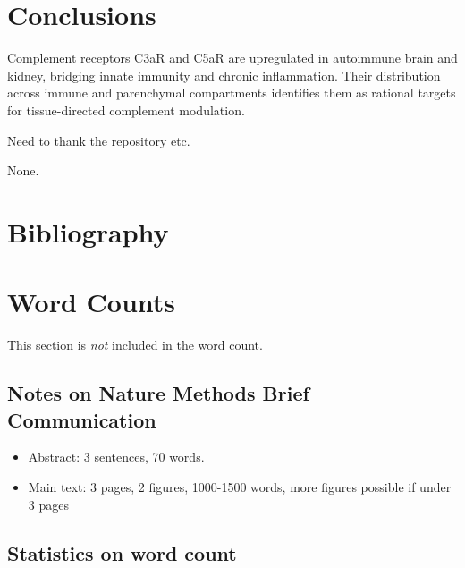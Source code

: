 \documentclass[times, twoside, watermark]{zHenriquesLab-StyleBioRxiv}
\begin{document}
\section*{Conclusions}
	Complement receptors C3aR and C5aR are upregulated in autoimmune brain and kidney, bridging innate immunity and chronic inflammation. Their distribution across immune and parenchymal compartments identifies them as rational targets for tissue-directed complement modulation.

\begin{acknowledgements}
Need to thank the repository etc.
\end{acknowledgements}

\begin{interests}
None.
\end{interests}

\section*{Bibliography}
%


\onecolumn
\newpage

\section*{Word Counts}
This section is \textit{not} included in the word count. 
\subsection*{Notes on Nature Methods Brief Communication}
\begin{itemize}
\item Abstract: 3 sentences, 70 words.
\item Main text: 3 pages, 2 figures, 1000-1500 words, more figures possible if under 3 pages
\end{itemize}

\subsection*{Statistics on word count}
\detailtexcount
\newpage

\captionsetup*{format=largeformat}
\end{document}

